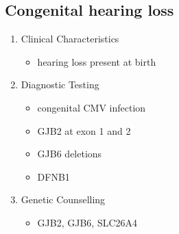 \documentclass[12pt]{scrartcl}
\begin{document}
\subsection{Congenital hearing loss}
\label{sec:org6706355}
\begin{enumerate}
\item Clinical Characteristics
\label{sec:org5e9f0fa}
\begin{itemize}
\item hearing loss present at birth
\end{itemize}
\item Diagnostic Testing
\label{sec:orgb6fb49c}
\begin{itemize}
\item congenital CMV infection
\item GJB2 at exon 1 and 2
\item GJB6 deletions
\item DFNB1
\end{itemize}
\item Genetic Counselling
\label{sec:org6406a19}
\begin{itemize}
\item GJB2, GJB6, SLC26A4
\end{itemize}
\end{enumerate}
\end{document}

